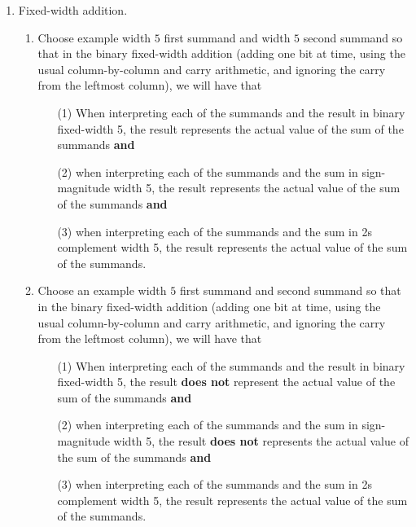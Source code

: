 \begin{enumerate}[labelindent=0pt, leftmargin=0pt]
        \item Fixed-width addition.  
        \begin{enumerate}
            \item\gradeCompleteFirst Choose  example width $5$ first summand and width $5$ second summand so that 
            in the  binary fixed-width addition (adding one bit at time, using 
            the usual column-by-column and carry arithmetic, and ignoring the carry 
            from the  leftmost column), we will have that
            \begin{itemize}
            \item[(1)] When interpreting each of the summands and the result in binary fixed-width 5, 
            the result represents the actual value of the sum of the summands {\bf and}
            \item[(2)] when interpreting each of the summands and the sum in sign-magnitude width 5, the result  
            represents the actual value of the sum of the summands {\bf and}
            \item[(3)] when interpreting each of the summands and the sum in 2s complement width 5, the result 
            represents the actual value of the sum of the summands.
            \end{itemize}
            \item\gradeCorrectFirst Choose an example width $5$ first summand and second summand so that 
            in the binary fixed-width addition (adding one bit at time, using 
            the usual column-by-column and carry arithmetic, and ignoring the carry 
            from the  leftmost column), we will have that
            \begin{itemize}
            \item[(1)] When interpreting each of the summands and the result in binary fixed-width 5, 
            the result {\bf does not} represent the actual value of the sum of the summands {\bf and}
            \item[(2)] when interpreting each of the summands and the sum in sign-magnitude width 5, the result  
            {\bf does not} represents the actual value of the sum of the summands {\bf and}
            \item[(3)] when interpreting each of the summands and the sum in 2s complement width 5, the result 
            represents the actual value of the sum of the summands.
            \end{itemize}

\end{enumerate}
\end{enumerate}
